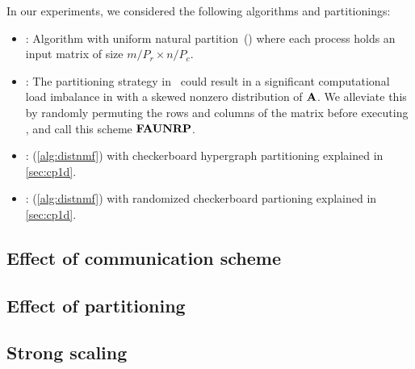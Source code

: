 In our experiments, we considered the following algorithms and partitionings:
\begin{itemize}
	\item \unp: \mpifaun Algorithm \cite{KBP16,KBP16MPIFAUN} with uniform natural  partition~(\unp) where each process holds an input matrix of size $m/P_r \times n/P_c$. 
	\item \urp: The partitioning strategy in \unp\ could result in a significant computational load imbalance in with a skewed nonzero distribution of $\mathbf{A}$. We alleviate this by randomly permuting the rows and columns of the matrix before executing \mpifaun, and call this scheme $\textbf{FAUNRP}$.
	\item \cpp: \distspnmf (\cref{alg:distnmf}) with checkerboard hypergraph partitioning explained in \cref{sec:cp1d}.
	\item \crp: \distspnmf (\cref{alg:distnmf}) with randomized checkerboard partioning explained in \cref{sec:cp1d}.
	
\end{itemize}


\subsection {Effect of communication scheme}

\subsection {Effect of partitioning}

\subsection {Strong scaling}

